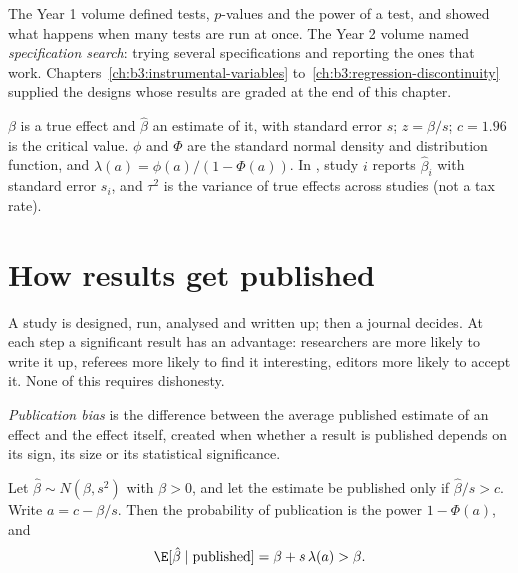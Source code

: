 \begin{recall}
The Year 1 volume defined tests, $p$-values and the power of a test, and
showed what happens when many tests are run at once. The Year 2 volume named
\emph{specification search}: trying several specifications and reporting the
ones that work. Chapters~\ref{ch:b3:instrumental-variables}
to~\ref{ch:b3:regression-discontinuity} supplied the designs whose results are
graded at the end of this chapter.
\end{recall}

\begin{notation}\label{not:b3:credible-empirical-work:symbols}
$\beta$ is a true effect and $\hat\beta$ an estimate of it, with standard error
$s$; $z = \hat\beta/s$; $c = 1.96$ is the critical value. $\phi$ and $\Phi$ are the
standard normal density and distribution function, and $\lambda(a) =
\phi(a)/(1 - \Phi(a))$. In , study $i$ reports $\hat\beta_i$ with
standard error $s_i$, and $\tau^2$ is the variance of true effects across
studies (not a tax rate).
\end{notation}

\section{How results get published}\label{sec:b3:credible-empirical-work:publication}

A study is designed, run, analysed and written up; then a journal decides. At
each step a significant result has an advantage: researchers are more likely to
write it up, referees more likely to find it interesting, editors more likely
to accept it. None of this requires dishonesty.

\begin{definition}\label{def:b3:credible-empirical-work:publication-bias}
\emph{Publication bias} is the difference between the average published
estimate of an effect and the effect itself, created when whether a result is
published depends on its sign, its size or its statistical significance.
\end{definition}

\begin{proposition}\label{prop:b3:credible-empirical-work:filter}
Let $\hat\beta \sim N(\beta, s^2)$ with $\beta > 0$, and let the estimate be
published only if $\hat\beta/s > c$. Write $a = c - \beta/s$. Then the
probability of publication is the power $1 - \Phi(a)$, and
\[
  \E[\hat\beta \mid \text{published}] = \beta + s\,\lambda(a) > \beta .
\]
\end{proposition}

